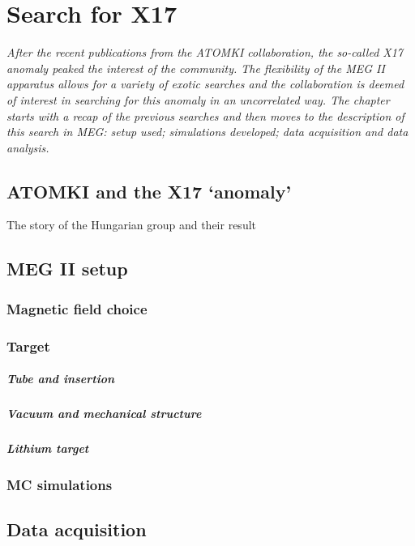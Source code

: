 \chapter{Search for X17}
\begin{refsection}
\label{ch:X17}
{\itshape After the recent publications from the ATOMKI collaboration, the so-called X17 anomaly peaked the interest of the community. The flexibility of the MEG II apparatus allows for a variety of exotic searches and the collaboration is deemed of interest in searching for this anomaly in an uncorrelated way.
The chapter starts with a recap of the previous searches and then moves to the description of this search in MEG: setup used; simulations developed; data acquisition and data analysis.}

\section{ATOMKI and the X17 `anomaly'}
    The story of the Hungarian group and their result
\section{MEG II setup}
    \subsection{Magnetic field choice}
    \subsection{Target}
        \paragraph{Tube and insertion}
        \paragraph{Vacuum and mechanical structure}
        \paragraph{Lithium target}
    \subsection{MC simulations}
\section{Data acquisition}

\end{refsection}
